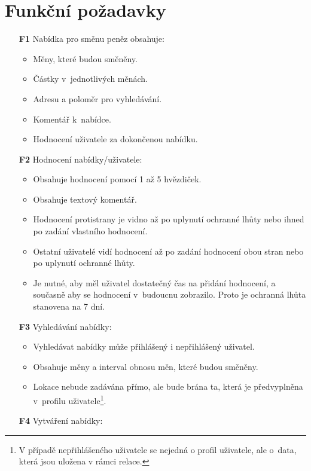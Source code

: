 \section{Funkční požadavky}
\begin{itemize}
    \item[\textbf{F1}] Nabídka pro směnu peněz obsahuje:
        \begin{itemize}
            \item Měny, které budou směněny.
            \item Částky v~jednotlivých měnách.
            \item Adresu a poloměr pro vyhledávání.
            \item Komentář k~nabídce.
            \item Hodnocení uživatele za dokončenou nabídku.
        \end{itemize}
    \item[\textbf{F2}] Hodnocení nabídky/uživatele:
        \begin{itemize}
            \item Obsahuje hodnocení pomocí 1 až 5 hvězdiček.
            \item Obsahuje textový komentář.
            \item Hodnocení protistrany je vidno až po uplynutí ochranné lhůty nebo ihned po zadání vlastního hodnocení.
            \item Ostatní uživatelé vidí hodnocení až po zadání hodnocení obou stran nebo po uplynutí ochranné lhůty.
            \item Je nutné, aby měl uživatel dostatečný čas na přidání hodnocení, a současně aby se hodnocení v~budoucnu zobrazilo. Proto je ochranná lhůta stanovena na 7 dní.
        \end{itemize}
    \item[\textbf{F3}] Vyhledávání nabídky:
        \begin{itemize}
            \item Vyhledávat nabídky může přihlášený i nepřihlášený uživatel.
            \item Obsahuje měny a interval obnosu měn, které budou směněny.
            \item Lokace nebude zadávána přímo, ale bude brána ta, která je předvyplněna v~profilu uživatele\footnote{V případě nepřihlášeného uživatele se nejedná o profil uživatele, ale o~data, která jsou uložena v rámci relace.}.
        \end{itemize}
    \item[\textbf{F4}] Vytváření nabídky:

\end{itemize}
